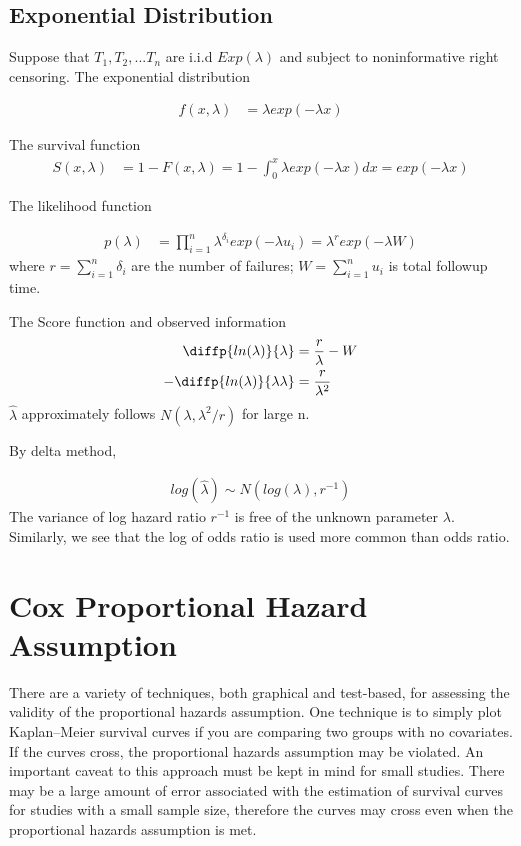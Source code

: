 \documentclass[11pt]{article} %
\begin{document}
\subsection{Exponential Distribution}
Suppose that $T_1, T_2, ... T_n$ are i.i.d $Exp(\lambda)$ and subject to noninformative right censoring. The exponential distribution

\begin{align*}
	f(x, \lambda) & = \lambda exp(-\lambda x)
\end{align*}

The survival function
\begin{align*}
	S(x, \lambda) & = 1- F(x, \lambda) =1- \int_{0}^x \lambda exp(-\lambda x) dx = exp(-\lambda x)
\end{align*}

The likelihood function

\begin{align*}
	p(\lambda) & = \prod_{i=1}^n \lambda^{\delta_i} exp(-\lambda u_i) = \lambda^r exp(-\lambda W)
\end{align*}
where $r = \sum_{i=1}^n \delta_i$ are the number of failures; $W=\sum_{i=1}^n u_i$ is total followup time.

The Score function and observed information
\begin{align*}
	\diffp{ln(\lambda)}{\lambda} & = \frac{r}{\lambda} -W\\
	-\diffp{ln(\lambda)}{{\lambda}{\lambda}} &= \frac{r}{\lambda^2}
\end{align*}
$\hat\lambda$ approximately follows $N(\lambda, \lambda^2/r)$ for large n.

By delta method,

\begin{align*}
	log(\hat\lambda) \sim N(log(\lambda), r^{-1})
\end{align*}
The variance of log hazard ratio $r^{-1}$ is free of the unknown parameter $\lambda$. Similarly, we see that the log of odds ratio is used more common than odds ratio. 


\section{Cox Proportional Hazard Assumption}

There are a variety of techniques, both graphical and test-based, for assessing the validity of the proportional hazards assumption. One technique is to simply plot Kaplan–Meier survival curves if you are comparing two groups with no covariates. If the curves cross, the proportional hazards assumption may be violated. An important caveat to this approach must be kept in mind for small studies. There may be a large amount of error associated with the estimation of survival curves for studies with a small sample size, therefore the curves may cross even when the proportional hazards assumption is met. 
\end{document}
